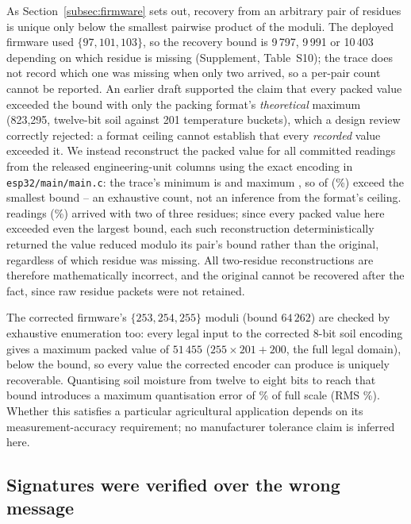 \documentclass[a4paper,fleqn]{cas-sc}
\begin{document}
As Section~\ref{subsec:firmware} sets out, recovery from an arbitrary pair
of residues is unique only below the smallest pairwise product of the
moduli. The deployed firmware used $\{97, 101, 103\}$, so the recovery
bound is 9\,797, 9\,991 or 10\,403 depending on which residue is missing
(Supplement, Table~S10); the trace does not record which one was missing
when only two arrived, so a per-pair count cannot be reported. An earlier
draft supported the claim that every packed value exceeded the bound with
only the packing format's \emph{theoretical} maximum (823,295, twelve-bit
soil against 201 temperature buckets), which a design review correctly
rejected: a format ceiling cannot establish that every
\emph{recorded} value exceeded it. We instead reconstruct the packed
value for all \CRTExceedN{} committed readings from the released
engineering-unit columns using the exact encoding in
\texttt{esp32/main/main.c}: the trace's minimum is \CRTPackedMin{} and
maximum \CRTPackedMax{}, so \CRTExceedCount{} of \CRTExceedN{}
(\CRTExceedPct\%) exceed the smallest bound -- an exhaustive count, not an
inference from the format's ceiling. \CRTRecovered{} readings
(\CRTLossRatePct\%) arrived with two of three residues; since every
packed value here exceeded even the largest bound, each such
reconstruction deterministically returned the value reduced modulo its
pair's bound rather than the original, regardless of which residue was
missing. All \CRTRecovered{} two-residue reconstructions are therefore
mathematically incorrect, and the original cannot be recovered after the
fact, since raw residue packets were not retained.

The corrected firmware's $\{253, 254, 255\}$ moduli (bound $64\,262$) are
checked by exhaustive enumeration too: every legal input to the corrected
8-bit soil encoding gives a maximum packed value of $51\,455$
($255 \times 201 + 200$, the full legal domain), below the bound, so
every value the corrected encoder can produce is uniquely recoverable.
Quantising soil moisture from twelve to eight bits to reach that bound
introduces a maximum quantisation error of \QuantErrMaxPct\% of full
scale (RMS \QuantErrRMSPct\%). Whether this satisfies a particular
agricultural application depends on its measurement-accuracy requirement;
no manufacturer tolerance claim is inferred here.

\subsection{Signatures were verified over the wrong message}
\label{subsec:pm_signature}
\end{document}
